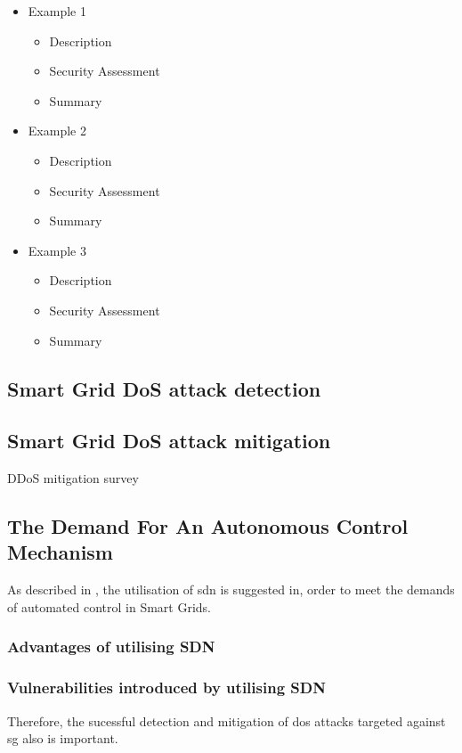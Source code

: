  


\begin{itemize}
    \item Example 1  
    \begin{itemize}
        \item Description 
        \item Security Assessment
        \item Summary
    \end{itemize}



\item Example 2
    \begin{itemize}
        \item Description 
        \item Security Assessment
        \item Summary
    \end{itemize}


    \item Example 3  
    \begin{itemize}
        \item Description 
        \item Security Assessment
        \item Summary
    \end{itemize}
    
\end{itemize}




\subsection{Smart Grid DoS attack detection}
\subsection{Smart Grid DoS attack mitigation}
DDoS mitigation survey 





\subsection{The Demand For An Autonomous Control Mechanism}
As described in \cite{rehmani2019software}, the utilisation of \acrfull{sdn} is suggested in, order to meet the demands of automated control in Smart Grids.
\subsubsection{Advantages of utilising SDN}
\subsubsection{Vulnerabilities introduced by utilising SDN}



Therefore, the sucessful detection and mitigation of \acrlong{dos} attacks targeted against \acrlong{sg} also is important.\\ 

